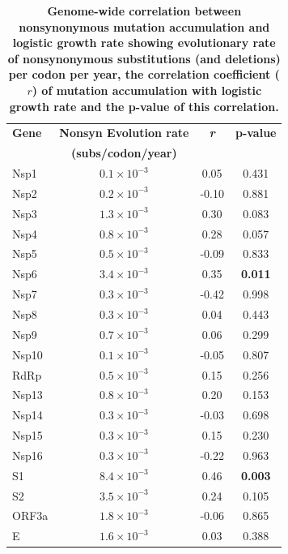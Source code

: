 \documentclass[11pt,oneside,letterpaper]{article}
\begin{document}
\begin{table}[]
    \begin{center}
    \caption{\textbf{Genome-wide correlation between nonsynonymous mutation accumulation and logistic growth rate showing evolutionary rate of nonsynonymous substitutions (and deletions) per codon per year, the correlation coefficient ($r$) of mutation accumulation with logistic growth rate and the p-value of this correlation.}}
    \begin{tabular}{lccc}
    \hline
    \textbf{Gene} & \textbf{Nonsyn Evolution rate} & \textbf{\emph{r}} & \textbf{p-value} \\
      & \textbf{(subs/codon/year)} &  &  \\ 
    \hline
    Nsp1  & $0.1 \times 10^{-3}$  & 0.05   & 0.431     \\
    Nsp2  & $0.2 \times 10^{-3}$  & -0.10  & 0.881     \\
    Nsp3  & $1.3 \times 10^{-3}$  & 0.30   & 0.083     \\
    Nsp4  & $0.8 \times 10^{-3}$  & 0.28   & 0.057     \\
    Nsp5  & $0.5 \times 10^{-3}$  & -0.09  & 0.833     \\
    Nsp6  & $3.4 \times 10^{-3}$  & 0.35   & \textbf{0.011}     \\
    Nsp7  & $0.3 \times 10^{-3}$  & -0.42  & 0.998     \\
    Nsp8  & $0.3 \times 10^{-3}$  & 0.04   & 0.443     \\
    Nsp9  & $0.7 \times 10^{-3}$  & 0.06   & 0.299     \\
    Nsp10 & $0.1 \times 10^{-3}$  & -0.05  & 0.807     \\
    RdRp  & $0.5 \times 10^{-3}$  & 0.15   & 0.256     \\
    Nsp13 & $0.8 \times 10^{-3}$  & 0.20   & 0.153     \\
    Nsp14 & $0.3 \times 10^{-3}$  & -0.03  & 0.698     \\
    Nsp15 & $0.3 \times 10^{-3}$  & 0.15   & 0.230     \\
    Nsp16 & $0.3 \times 10^{-3}$  & -0.22  & 0.963     \\
    S1    & $8.4 \times 10^{-3}$  & 0.46   & \textbf{0.003}     \\
    S2    & $3.5 \times 10^{-3}$  & 0.24   & 0.105     \\
    ORF3a & $1.8 \times 10^{-3}$  & -0.06  & 0.865     \\
    E     & $1.6 \times 10^{-3}$  & 0.03   & 0.388     \\

\end{tabular}
\end{center}
\end{table}
\end{document}
